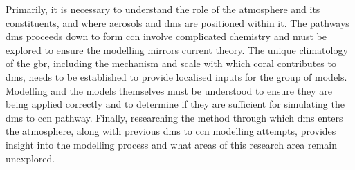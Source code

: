 Primarily, it is necessary to understand the role of the atmosphere and its constituents, and where aerosols and \gls{dms} are positioned within it. The pathways \gls{dms} proceeds down to form \gls{ccn} involve complicated chemistry \citep{barnes:2006ug} and must be explored to ensure the modelling mirrors current theory. The unique climatology of the \gls{gbr}, including the mechanism and scale with which coral contributes to \gls{dms}, needs to be established to provide localised inputs for the group of models. Modelling and the models themselves must be understood to ensure they are being applied correctly and to determine if they are sufficient for simulating the \gls{dms} to \gls{ccn} pathway. Finally, researching the method through which \gls{dms} enters the atmosphere, along with previous \gls{dms} to \gls{ccn} modelling attempts, provides insight into the modelling process and what areas of this research area remain unexplored.



